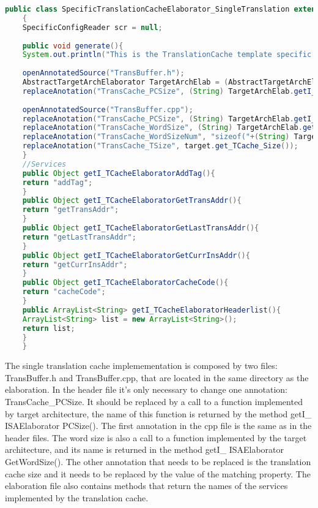 	\begin{lstlisting}[caption={Single Translation Cache Elaboration}, label={lst:STCacheElab},language=java]
	public class SpecificTranslationCacheElaborator_SingleTranslation extends AbstractTranslationCacheElaborator 
	{
	SpecificConfigReader scr = null;
	
	public void generate(){
	System.out.println("This is the TranslationCache template specific elaboration.");
	
	openAnnotatedSource("TransBuffer.h");		
	AbstractTargetArchElaborator TargetArchElab = (AbstractTargetArchElaborator) getElaborator((_TargetArch) target.get_r_ISA());
	replaceAnotation("TransCache_PCSize", (String) TargetArchElab.getI_ISAElaboratorPCSize());
	
	openAnnotatedSource("TransBuffer.cpp");		
	replaceAnotation("TransCache_PCSize", (String) TargetArchElab.getI_ISAElaboratorPCSize());		
	replaceAnotation("TransCache_WordSize", (String) TargetArchElab.getI_ISAElaboratorGetWordSize());
	replaceAnotation("TransCache_WordSizeNum", "sizeof("+(String) TargetArchElab.getI_ISAElaboratorGetWordSize()+")");
	replaceAnotation("TransCache_TSize", target.get_TCache_Size());
	}
	//Services
	public Object getI_TCacheElaboratorAddTag(){
	return "addTag";
	}
	public Object getI_TCacheElaboratorGetTransAddr(){
	return "getTransAddr";
	}
	public Object getI_TCacheElaboratorGetLastTransAddr(){
	return "getLastTransAddr";
	}
	public Object getI_TCacheElaboratorGetCurrInsAddr(){
	return "getCurrInsAddr";
	}
	public Object getI_TCacheElaboratorCacheCode(){
	return "cacheCode";
	}
	public ArrayList<String> getI_TCacheElaboratorHeaderlist(){
	ArrayList<String> list = new ArrayList<String>();
	return list;
	}	
	}
	\end{lstlisting}
	
	The single translation cache implemementation is composed by two files: TransBuffer.h and TransBuffer.cpp, that are located in the same directory as the elaboration. In the header file it's only necessary to change one annotation: TransCache\_PCSize. It should be replaced by a call to a function implemented by target architecture, the name of this function is returned by the method getI\_ ISAElaborator PCSize().
	The first annotation in the cpp file is the same as in the header files. The word size is also a call to a function implemented by the target architecture, and its name is returned in the method getI\_ ISAElaborator GetWordSize(). The other annotation that needs to be replaced is the translation cache size and it needs to be replaced by the value of the matching property.
	The elaboration file also contains methods that return the names of the services implemented by the translation cache.
	





